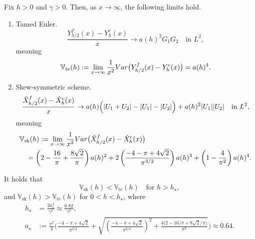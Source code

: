 \documentclass[10pt,a4paper]{amsart}
\begin{document}
\begin{theorem}
\label{thm:main}
Fix $h>0$ and $\gamma>0$. Then, as $x \to \infty$, the following limits hold.

\begin{enumerate}[leftmargin=0.5cm]
\item[(i)] Tamed Euler.
\[
\frac{Y_{h/2}^f(x) - Y_h^c(x)}{x}
\rightarrow
a(h)^2 G_1 G_2
\quad \text{in } L^2,
\]
meaning
\[
\mathbb{V}_\mathrm{te}(h) := \lim_{x\to\infty}
\frac{1}{x^2}
\textup{Var} \bigl(Y_{h/2}^f(x) - Y_h^c(x)\bigr)
=
a(h)^4.
\]

\item[(ii)] Skew-symmetric scheme.
\[
\frac{\tilde{X}_{h/2}^f(x) - \tilde{X}_h^c(x)}{x}
\rightarrow
a(h)\Bigl(|U_1+U_2| - |U_1| - |U_2|\Bigr)
+ a(h)^2 |U_1||U_2|
\quad \text{in } L^2,
\]
meaning
\begin{align*}
& \mathbb{V}_{\mathrm{sk}}(h)
:=
\lim_{x\to\infty}
\frac{1}{x^2}\textup{Var}\bigl(\tilde{X}_{h/2}^f(x) - \tilde{X}_h^c(x)\bigr)
\\
&\quad=
\left( 2 - \frac{16}{\pi} + \frac{8\sqrt{2}}{\pi} \right) a(h)^2 
+ 
2 \left(\frac{-4 - \pi + 4\sqrt{2}}{\pi^{3/2}}\right) a(h)^3 
+ 
\left( 1 - \frac{4}{\pi^2} \right) a(h)^4.
\end{align*}
\end{enumerate}
\end{theorem}

\begin{corollary} 
\label{cor:comparison}
It holds that
\[
\mathbb{V}_{\mathrm{sk}}(h) < \mathbb{V}_{\mathrm{te}}(h)
\quad \text{for } h > h_\star,
\]
and $\mathbb{V}_{\mathrm{sk}}(h) > \mathbb{V}_{\mathrm{te}}(h)$ for $0< h < h_\star$, where 
\begin{align*}
h_\star 
&= \frac{2a_\star^2}{\gamma^2} \approx \frac{0.82}{\gamma^2}, 
\\
a_\star
&:=
\frac{\pi^2}{4}
\Biggl(
\frac{-4-\pi+4\sqrt{2}}{\pi^{3/2}} + \sqrt{\left(\frac{-4-\pi+4\sqrt{2}}{\pi^{3/2}}\right)^2 + \frac{4 \bigl(2 - 16/\pi + 8\sqrt{2}/\pi \bigr)}{\pi^2}}
\Biggr) \approx 0.64.
\end{align*}
\end{corollary}
\end{document}
